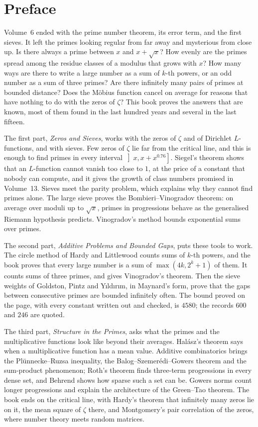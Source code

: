 \chapter*{Preface}
Volume~6 ended with the prime number theorem, its error term, and the first sieves. It left the primes looking regular from far away and mysterious from close up. Is there always a prime between $x$ and $x+\sqrt x$? How evenly are the primes spread among the residue classes of a modulus that grows with $x$? How many ways are there to write a large number as a sum of $k$-th powers, or an odd number as a sum of three primes? Are there infinitely many pairs of primes at bounded distance? Does the M\"obius function cancel on average for reasons that have nothing to do with the zeros of $\zeta$? This book proves the answers that are known, most of them found in the last hundred years and several in the last fifteen.

The first part, \emph{Zeros and Sieves}, works with the zeros of $\zeta$ and of Dirichlet $L$-functions, and with sieves. Few zeros of $\zeta$ lie far from the critical line, and this is enough to find primes in every interval $\left]x,x+x^{0.76}\right]$. Siegel's theorem shows that an $L$-function cannot vanish too close to $1$, at the price of a constant that nobody can compute, and it gives the growth of class numbers promised in Volume~13. Sieves meet the parity problem, which explains why they cannot find primes alone. The large sieve proves the Bombieri--Vinogradov theorem: on average over moduli up to $\sqrt x$, primes in progressions behave as the generalised Riemann hypothesis predicts. Vinogradov's method bounds exponential sums over primes.

The second part, \emph{Additive Problems and Bounded Gaps}, puts these tools to work. The circle method of Hardy and Littlewood counts sums of $k$-th powers, and the book proves that every large number is a sum of $\max(4k,2^k+1)$ of them. It counts sums of three primes, and gives Vinogradov's theorem. Then the sieve weights of Goldston, Pintz and Y\i ld\i r\i m, in Maynard's form, prove that the gaps between consecutive primes are bounded infinitely often. The bound proved on the page, with every constant written out and checked, is $4580$; the records $600$ and $246$ are quoted.

The third part, \emph{Structure in the Primes}, asks what the primes and the multiplicative functions look like beyond their averages. Hal\'asz's theorem says when a multiplicative function has a mean value. Additive combinatorics brings the Pl\"unnecke--Ruzsa inequality, the Balog--Szemer\'edi--Gowers theorem and the sum-product phenomenon; Roth's theorem finds three-term progressions in every dense set, and Behrend shows how sparse such a set can be. Gowers norms count longer progressions and explain the architecture of the Green--Tao theorem. The book ends on the critical line, with Hardy's theorem that infinitely many zeros lie on it, the mean square of $\zeta$ there, and Montgomery's pair correlation of the zeros, where number theory meets random matrices.

